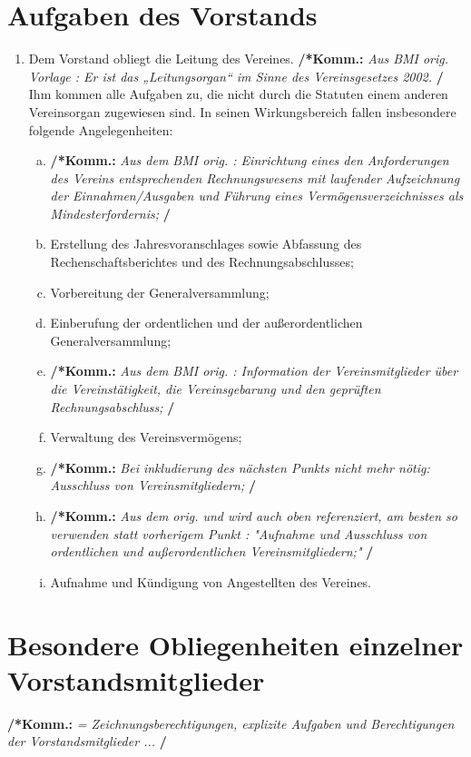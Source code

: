 \documentclass[a4paper,12pt]{article}
\newcommand{\comment}[1]{{\bf /*Komm.:} \textit{#1} {\bf */}}
\begin{document}
\section{Aufgaben des Vorstands} %
\begin{enumerate}
\item Dem Vorstand obliegt die Leitung des Vereines. \comment{Aus BMI orig. Vorlage : Er ist das „Leitungsorgan“ im Sinne des Vereinsgesetzes 2002. } Ihm kommen alle Aufgaben zu, die nicht durch die Statuten einem anderen Vereinsorgan zugewiesen sind. In seinen Wirkungsbereich fallen insbesondere folgende Angelegenheiten:
	\begin{enumerate}[(a)]
	\item \comment{Aus dem BMI orig. : Einrichtung eines den Anforderungen des Vereins entsprechenden Rechnungswesens mit laufender Aufzeichnung der Einnahmen/Ausgaben und Führung eines Vermögensverzeichnisses als Mindesterfordernis;}
	\item Erstellung des Jahresvoranschlages sowie Abfassung des Rechenschaftsberichtes und des Rechnungsabschlusses;
	\item Vorbereitung der Generalversammlung;
	\item Einberufung der ordentlichen und der außerordentlichen Generalversammlung;
	\item \comment{Aus dem BMI orig. : Information der Vereinsmitglieder über die Vereinstätigkeit, die Vereinsgebarung und den geprüften Rechnungsabschluss;}
	\item Verwaltung des Vereinsvermögens;
	\item \comment{Bei inkludierung des nächsten Punkts nicht mehr nötig: Ausschluss von Vereinsmitgliedern;}
	\item \comment{Aus dem orig. und wird auch oben referenziert, am besten so verwenden statt vorherigem Punkt :  "Aufnahme und Ausschluss von ordentlichen und außerordentlichen Vereinsmitgliedern;"}
	\item Aufnahme und Kündigung von Angestellten des Vereines.
	\end{enumerate}
\end{enumerate}

\section{Besondere Obliegenheiten einzelner Vorstandsmitglieder} %
\comment{ = Zeichnungsberechtigungen, explizite Aufgaben und Berechtigungen der Vorstandsmitglieder ... }
\end{document}
